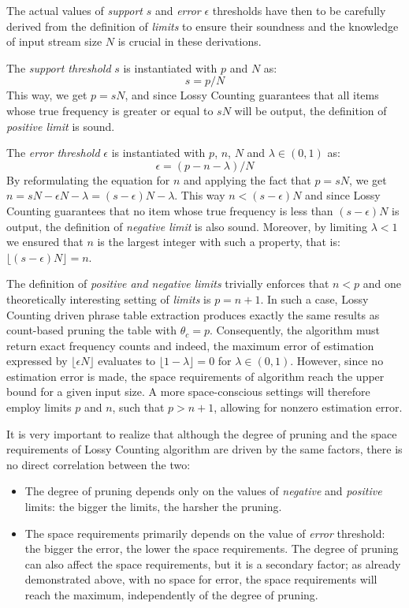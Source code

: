 The actual values of \emph{support} $s$ and \emph{error} $\epsilon$ thresholds have then
to be carefully derived from the definition of \emph{limits} to ensure their soundness and
the knowledge of input stream size $N$ is crucial in these derivations.

The \emph{support threshold} $s$ is instantiated with $p$ and $N$ as:
\begin{equation}
  s = p / N
\end{equation}
This way, we get $p = sN$, and since Lossy Counting guarantees that all items whose true
frequency is greater or equal to $sN$ will be output, the definition of \emph{positive limit} is sound.

The \emph{error threshold} $\epsilon$ is instantiated with $p$, $n$, $N$ and $\lambda \in (0,1)$ as:
\begin{equation}
\label{eq:epsilon}
  \epsilon = (p - n - \lambda) / N
\end{equation}
By reformulating the equation for $n$ and applying the fact that $p = sN$,
we get $n = sN - \epsilon N - \lambda = (s - \epsilon)N - \lambda$.
This way $n < (s - \epsilon)N$ and since Lossy Counting guarantees that no item whose
true frequency is less than $(s - \epsilon)N$ is output, the definition of
\emph{negative limit} is also sound.
Moreover, by limiting $\lambda < 1$ we ensured that $n$ is the largest integer with such
a property, that is: $\lfloor (s - \epsilon)N \rfloor = n$.

The definition of \emph{positive and negative limits} trivially enforces that $n < p$ and
one theoretically interesting setting of \emph{limits} is $p = n + 1$.
In such a case, Lossy Counting driven phrase table extraction produces exactly the same
results as count-based pruning the table with $\theta_{c} = p$.
Consequently, the algorithm must return exact frequency counts and indeed,
the maximum error of estimation expressed by $\lfloor \epsilon N\rfloor $ evaluates to
$\lfloor 1 - \lambda \rfloor = 0$ for $\lambda \in (0,1)$.
However, since no estimation error is made, the space requirements of algorithm
reach the upper bound for a given input size.
A more space-conscious settings will therefore employ limits $p$ and $n$,
such that $p > n + 1$, allowing for nonzero estimation error.

It is very important to realize that although the degree of pruning and
the space requirements of Lossy Counting algorithm are driven by the same factors,
there is no direct correlation between the two:
\begin{itemize}
  \item The degree of pruning depends only on the values of \emph{negative} and
    \emph{positive} limits: the bigger the limits, the harsher the pruning.
  \item The space requirements primarily depends on the value of \emph{error} threshold:
    the bigger the error, the lower the space requirements.
    The degree of pruning can also affect the space requirements, but it is
    a secondary factor; as already demonstrated above, with no space for error,
    the space requirements will reach the maximum, independently of the degree of pruning.
\end{itemize}

